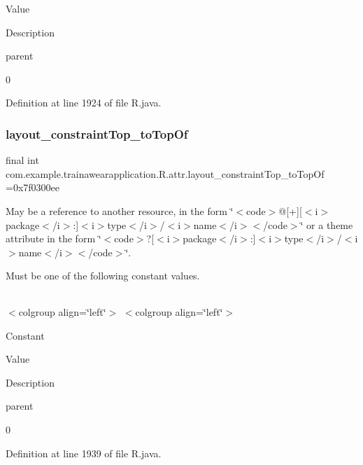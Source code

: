 Value

Description 

parent

0

Definition at line 1924 of file R.\+java.

\mbox{\label{classcom_1_1example_1_1trainawearapplication_1_1_r_1_1attr_a37fd90c107277bcbecb5838175b61fda}} 
\subsubsection{\texorpdfstring{layout\_constraintTop\_toTopOf}{layout\_constraintTop\_toTopOf}}
{\footnotesize\ttfamily final int com.\+example.\+trainawearapplication.\+R.\+attr.\+layout\+\_\+constraint\+Top\+\_\+to\+Top\+Of =0x7f0300ee\hspace{0.3cm}{\ttfamily [static]}}

May be a reference to another resource, in the form \char`\"{}$<$code$>$@\mbox{[}+\mbox{]}\mbox{[}$<$i$>$package$<$/i$>$\+:\mbox{]}$<$i$>$type$<$/i$>$/$<$i$>$name$<$/i$>$$<$/code$>$\char`\"{} or a theme attribute in the form \char`\"{}$<$code$>$?\mbox{[}$<$i$>$package$<$/i$>$\+:\mbox{]}$<$i$>$type$<$/i$>$/$<$i$>$name$<$/i$>$$<$/code$>$\char`\"{}. 

Must be one of the following constant values.

\tabulinesep=1mm
\begin{longtabu}spread 0pt [c]{*{0}{|X[-1]}|}
\hline
\end{longtabu}
$<$colgroup align=\char`\"{}left\char`\"{}$>$ $<$colgroup align=\char`\"{}left\char`\"{}$>$ 

Constant

Value

Description 

parent

0

Definition at line 1939 of file R.\+java.

\mbox{\label{classcom_1_1example_1_1trainawearapplication_1_1_r_1_1attr_adad59185c23683397d0a9bd010bc1ff4}} 
